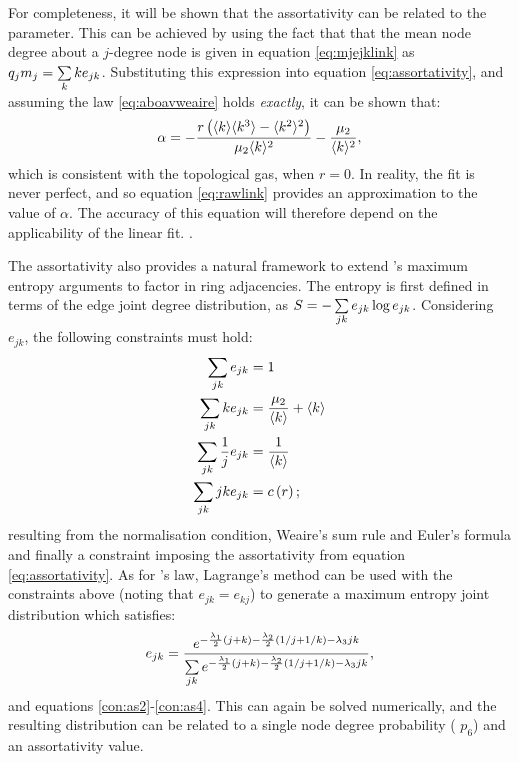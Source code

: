 For completeness, it will be shown that the assortativity can be related to the \aw{} parameter.
This can be achieved by using the fact that that the mean node degree about a $j$-degree node is given in equation \eqref{eq:mjejklink} as $q_jm_j=\sum\limits_k ke_{jk}$.
Substituting this expression into equation \eqref{eq:assortativity}, and assuming the \aw{} law \eqref{eq:aboavweaire} holds \textit{exactly}, it can be shown that:
\begin{equation}
        \label{eq:rawlink}
        \alpha = - \frac{r\left(\langle k \rangle\langle k^3 \rangle-\langle k^2 \rangle^2\right)}{\mu_2\langle k \rangle^2}-\frac{\mu_2}{\langle k \rangle^2},
\end{equation}
which is consistent with the topological gas, when $r=0$.
In reality, the \aw{} fit is never perfect, and so equation \eqref{eq:rawlink} provides an approximation to the value of $\alpha$. 
The accuracy of this equation will therefore depend on the applicability of the linear fit.
.

The assortativity also provides a natural framework to extend \lm's maximum entropy arguments to factor in ring adjacencies.
The entropy is first defined in terms of the edge joint degree distribution, as $S=-\sum\limits_{jk} e_{jk}\log e_{jk}$.
Considering $e_{jk}$, the following constraints must hold:
\begin{align}
        \sum\limits_{jk} e_{jk} &=1 \label{con:as1}\\
        \sum\limits_{jk} ke_{jk} &= \frac{\mu_2}{\langle k \rangle}+\langle k \rangle \label{con:as2}\\
        \sum\limits_{jk} \frac{1}{j}e_{jk} &= \frac{1}{\langle k \rangle} \label{con:as3}\\
        \sum\limits_{jk} jke_{jk} &= c\left(r\right)\label{con:as4};
\end{align}
resulting from the normalisation condition, Weaire's sum rule \cite{Weaire1974} and Euler's formula and finally a constraint imposing the assortativity from equation \eqref{eq:assortativity}.
As for \lm's law, Lagrange's method can be used with the constraints above (noting that $e_{jk}=e_{kj}$) to generate a maximum entropy joint distribution which satisfies:
\begin{equation}
        \label{eq:mer}
        e_{jk} = \frac{e^{-\frac{\lambda_1}{2}\left(j+k\right)-\frac{\lambda_2}{2}\left(1/j+1/k\right)-\lambda_3 jk}}{\sum\limits_{jk} e^{-\frac{\lambda_1}{2}\left(j+k\right)-\frac{\lambda_2}{2}\left(1/j+1/k\right)-\lambda_3 jk}},
\end{equation}
and equations \eqref{con:as2}\--\eqref{con:as4}.
This can again be solved numerically, and the resulting distribution can be related to a single node degree probability (\eg{} $p_6$) and an assortativity value.

